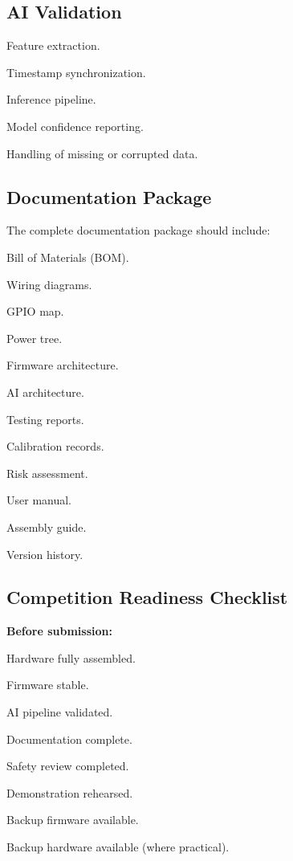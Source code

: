\subsection{AI Validation}
\label{sec:ai-validation-ch8}

\begin{checklist}
    \item Feature extraction.
    \item Timestamp synchronization.
    \item Inference pipeline.
    \item Model confidence reporting.
    \item Handling of missing or corrupted data.
\end{checklist}

\subsection{Documentation Package}
\label{sec:documentation-package}

The complete documentation package should include:
\begin{checklist}
    \item Bill of Materials (BOM).
    \item Wiring diagrams.
    \item GPIO map.
    \item Power tree.
    \item Firmware architecture.
    \item AI architecture.
    \item Testing reports.
    \item Calibration records.
    \item Risk assessment.
    \item User manual.
    \item Assembly guide.
    \item Version history.
\end{checklist}

\subsection{Competition Readiness Checklist}
\label{sec:competition-readiness}

\begin{requirementbox}
\textbf{Before submission:}
\begin{checklist}
    \item Hardware fully assembled.
    \item Firmware stable.
    \item AI pipeline validated.
    \item Documentation complete.
    \item Safety review completed.
    \item Demonstration rehearsed.
    \item Backup firmware available.
    \item Backup hardware available (where practical).
\end{checklist}
\end{requirementbox}

